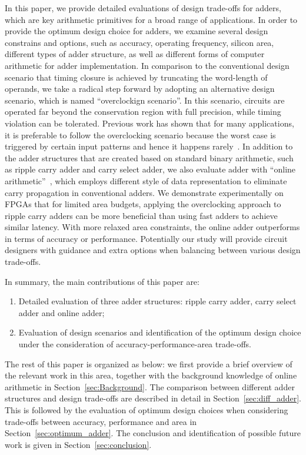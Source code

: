 \documentclass[10pt, conference, compsocconf]{IEEEtran}
\begin{document}
In this paper, we provide detailed evaluations of design trade-offs for adders, which are key arithmetic primitives for a broad range of applications. In order to provide the optimum design choice for adders, we examine several design constrains and options, such as accuracy, operating frequency, silicon area, different types of adder structure, as well as different forms of computer arithmetic for adder implementation. In comparison to the conventional design scenario that timing closure is achieved by truncating the word-length of operands, we take a radical step forward by adopting an alternative design scenario, which is named ``overclockign scenario''. In this scenario, circuits are operated far beyond the conservation region with full precision, while timing violation can be tolerated. Previous work has shown that for many applications, it is preferable to follow the overclocking scenario because the worst case is triggered by certain input patterns and hence it happens rarely~\cite{SKfccm13}. In addition to the adder structures that are created based on standard binary arithmetic, such as ripple carry adder and carry select adder, we also evaluate adder with ``online arithmetic''~\cite{Ercegovac_OnlineOverview}, which employs different style of data representation to eliminate carry propagation in conventional adders. We demonstrate experimentally on FPGAs that for limited area budgets, applying the overclocking approach to ripple carry adders can be more beneficial than using fast adders to achieve similar latency. With more relaxed area constraints, the online adder outperforms in terms of accuracy or performance. Potentially our study will provide circuit designers with guidance and extra options when balancing between various design trade-offs.

In summary, the main contributions of this paper are:
\begin{enumerate}
  \item Detailed evaluation of three adder structures: ripple carry adder, carry select adder and online adder; 
  \item Evaluation of design scenarios and identification of the optimum design choice under the consideration of accuracy-performance-area trade-offs.
\end{enumerate}

The rest of this paper is organized as below: we first provide a brief overview of the relevant work in this area, together with the background knowledge of online arithmetic in Section~\ref{sec:Background}. The comparison between different adder structures and design trade-offs are described in detail in Section~\ref{sec:diff_adder}. This is followed by the evaluation of optimum design choices when considering trade-offs between accuracy, performance and area in Section~\ref{sec:optimum_adder}. The conclusion and identification of possible future work is given in Section~\ref{sec:conclusion}.
\end{document}
